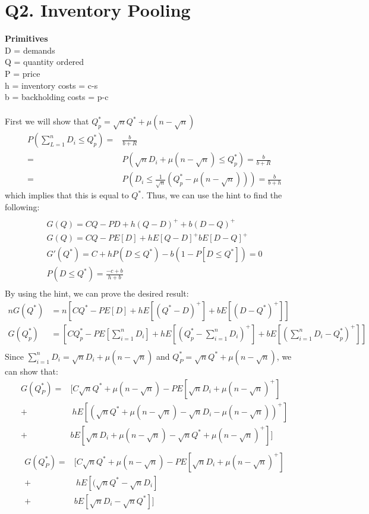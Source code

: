 \documentclass[10pt,a4paper]{article} \usepackage[latin1]{inputenc}
\begin{document}
 \section{Q2. Inventory Pooling}
	\textbf{Primitives}\\ D = demands \\ Q = quantity ordered \\ P = price \\ h =
	inventory costs =  c-s \\ b = backholding costs = p-c \\ \\ First we will show
	that $Q_p^* = \sqrt{n}Q^* + \mu(n- \sqrt{n})$%
	\begin{align*} P (\sum_{L= 1}^n D_i \leq Q_p^*) = &  \frac{b}{b+R} \\ = &
	P(\sqrt{n}D_i + \mu(n - \sqrt{n})\leq Q_p^*) = \frac{b}{b+R} \\ = & P(D_i \leq
	\frac{1}{\sqrt{n}}(Q_p^*- \mu(n-\sqrt{n})))= \frac{b}{b + h} \end{align*} which
	implies that this is equal to $Q^*$. Thus, we can use the hint to find the
	following: 
	\begin{align*} %
	\end{align*}
	 \begin{align*} G(Q) = CQ - PD + h(Q-D)^++b(D-Q)^+ \\ G(Q) = CQ -
	PE[D] + hE[Q-D]^+bE[D-Q]^+ \\ G'(Q^*)= C + hP(D \leq Q^*) - b(1-P[D\leq Q^*]) =
	0 \\ P(D \leq Q^*) = \frac{-c+b}{h+b} \\ 
	\end{align*} By using the hint, we can prove the desired result: 
	\begin{align*} nG(Q^*) &=
	n[CQ^*-PE[D]+hE[(Q^*-D)^+]+bE[(D-Q^*)^+]]\\ G(Q^*_p) & =
	[CQ^*_p-PE[\sum_{i=1}^nD_i]+hE[(Q^*_p-\sum_{i=1}^nD_i)^+]+bE[(\sum_{i=1}^nD_i-Q^*_p)^+]]\\ 
	\end{align*} 
	Since $\sum_{i = 1}^nD_i = \sqrt{n}D_i+\mu(n-\sqrt{n})$ and $Q^*_P = \sqrt{n}Q^*+\mu(n-\sqrt{n})$, we can show that:\\
	\begin{align*} 
	G(Q^*_P) = & [C\sqrt{n}Q^*+\mu(n-\sqrt{n})-PE[\sqrt{n}D_i +  \mu(n-\sqrt{n})^+]\\
	+& \ hE[(\sqrt{n}Q^*+\mu(n-\sqrt{n})-\sqrt{n}D_i-\mu(n-\sqrt{n}))^+] \\
	+& b E[\sqrt{n}D_i+\mu(n-\sqrt{n})-\sqrt{n}Q^*+\mu(n-\sqrt{n})^+]]\\ 
	\end{align*} 
	\begin{align*} 
G(Q^*_P) = & [C\sqrt{n}Q^*+\mu(n-\sqrt{n})-PE[\sqrt{n}D_i +  \mu(n-\sqrt{n})^+]\\
+& \ hE[(\sqrt{n}Q^*-\sqrt{n}D_i] \\
+& b E[\sqrt{n}D_i-\sqrt{n}Q^*]]\\ 
\end{align*} 
\end{document}
